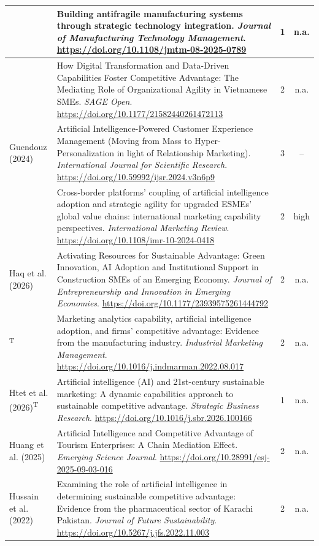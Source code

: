 {\begin{longtable}{|>{\raggedright\arraybackslash}p{2.6cm}|>{\raggedright\arraybackslash}p{10.2cm}|c|c|}
\textcite{ghobakhloo2025} & Building antifragile manufacturing systems through strategic technology integration. \textit{Journal of Manufacturing Technology Management}. \url{https://doi.org/10.1108/jmtm-08-2025-0789} & 1 & n.a. \\ \hline
\textcite{giang2026} & How Digital Transformation and Data-Driven Capabilities Foster Competitive Advantage: The Mediating Role of Organizational Agility in Vietnamese SMEs. \textit{SAGE Open}. \url{https://doi.org/10.1177/21582440261472113} & 2 & n.a. \\ \hline
Guendouz (2024) & Artificial Intelligence-Powered Customer Experience Management (Moving from Mass to Hyper-Personalization in light of Relationship Marketing). \textit{International Journal for Scientific Research}. \url{https://doi.org/10.59992/ijsr.2024.v3n6p9} & 3 & -- \\ \hline
\textcite{guo2025} & Cross-border platforms’ coupling of artificial intelligence adoption and strategic agility for upgraded ESMEs’ global value chains: international marketing capability perspectives. \textit{International Marketing Review}. \url{https://doi.org/10.1108/imr-10-2024-0418} & 2 & high \\ \hline
Haq et al. (2026) & Activating Resources for Sustainable Advantage: Green Innovation, AI Adoption and Institutional Support in Construction SMEs of an Emerging Economy. \textit{Journal of Entrepreneurship and Innovation in Emerging Economies}. \url{https://doi.org/10.1177/23939575261444792} & 2 & n.a. \\ \hline
\textcite{hossain2022}\textsuperscript{T} & Marketing analytics capability, artificial intelligence adoption, and firms' competitive advantage: Evidence from the manufacturing industry. \textit{Industrial Marketing Management}. \url{https://doi.org/10.1016/j.indmarman.2022.08.017} & 2 & n.a. \\ \hline
Htet et al. (2026)\textsuperscript{T} & Artificial intelligence (AI) and 21st-century sustainable marketing: A dynamic capabilities approach to sustainable competitive advantage. \textit{Strategic Business Research}. \url{https://doi.org/10.1016/j.sbr.2026.100166} & 1 & n.a. \\ \hline
Huang et al. (2025) & Artificial Intelligence and Competitive Advantage of Tourism Enterprises: A Chain Mediation Effect. \textit{Emerging Science Journal}. \url{https://doi.org/10.28991/esj-2025-09-03-016} & 2 & n.a. \\ \hline
Hussain et al. (2022) & Examining the role of artificial intelligence in determining sustainable competitive advantage: Evidence from the pharmaceutical sector of Karachi Pakistan. \textit{Journal of Future Sustainability}. \url{https://doi.org/10.5267/j.jfs.2022.11.003} & 2 & n.a. \\ \hline

\end{longtable}}
